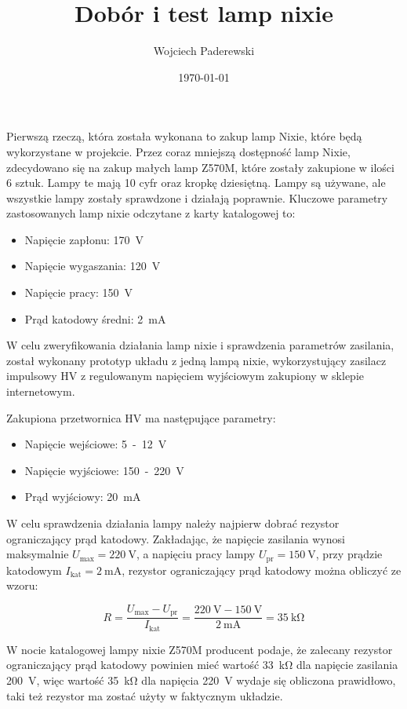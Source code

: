\documentclass[../main.tex]{subfiles}
\author{Wojciech Paderewski}
\date{\today}
\title{Dobór i test lamp nixie}
\begin{document}
Pierwszą rzeczą, która została wykonana to zakup lamp Nixie, które będą wykorzystane w projekcie. 
Przez coraz mniejszą dostępność lamp Nixie,
zdecydowano się na zakup małych lamp Z570M, które zostały zakupione w ilości 6 sztuk. Lampy te mają 10 cyfr oraz kropkę dziesiętną.
Lampy są używane, ale wszystkie lampy zostały sprawdzone i działają poprawnie.
Kluczowe parametry zastosowanych lamp nixie odczytane z karty katalogowej\cite{st:Z5730M} to:
\begin{itemize}
    \item Napięcie zapłonu: \SI{170}{\volt}
    \item Napięcie wygaszania: \SI{120}{\volt}
    \item Napięcie pracy: \SI{150}{\volt}
    \item Prąd katodowy średni: \SI{2}{\milli\ampere}
\end{itemize}

W celu zweryfikowania działania lamp nixie i sprawdzenia parametrów zasilania, został wykonany prototyp układu z jedną lampą nixie,
wykorzystujący zasilacz impulsowy HV z regulowanym napięciem wyjściowym zakupiony w sklepie internetowym.

Zakupiona przetwornica HV ma następujące parametry:
\begin{itemize}
    \item Napięcie wejściowe: \SI{5}-\SI{12}{\volt}
    \item Napięcie wyjściowe: \SI{150}-\SI{220}{\volt}
    \item Prąd wyjściowy: \SI{20}{\milli\ampere}
\end{itemize}

W celu sprawdzenia działania lampy należy najpierw dobrać rezystor ograniczający prąd katodowy.
Zakładając, że napięcie zasilania wynosi maksymalnie $U_{\text{max}} = \SI{220}{\volt}$, a napięciu pracy lampy $U_{\text{pr}} = \SI{150}{\volt}$,
przy prądzie katodowym $I_{\text{kat}} = \SI{2}{\milli\ampere}$, rezystor ograniczający prąd katodowy można obliczyć ze wzoru:

\begin{equation}
    R = \frac{U_{\text{max}} - U_{\text{pr}}}{I_{\text{kat}}} = \frac{\SI{220}{\volt} - \SI{150}{\volt}}{\SI{2}{\milli\ampere}} = \SI{35}{\kilo\ohm}
\end{equation}

W nocie katalogowej lampy nixie Z570M producent podaje, że zalecany rezystor ograniczający prąd katodowy 
powinien mieć wartość \SI{33}{\kilo\ohm} dla napięcie zasilania \SI{200}{\volt}, więc wartość \SI{35}{\kilo\ohm} dla napięcia \SI{220}{\volt}
wydaje się obliczona prawidłowo, taki też rezystor ma zostać użyty w faktycznym układzie.
\end{document}
